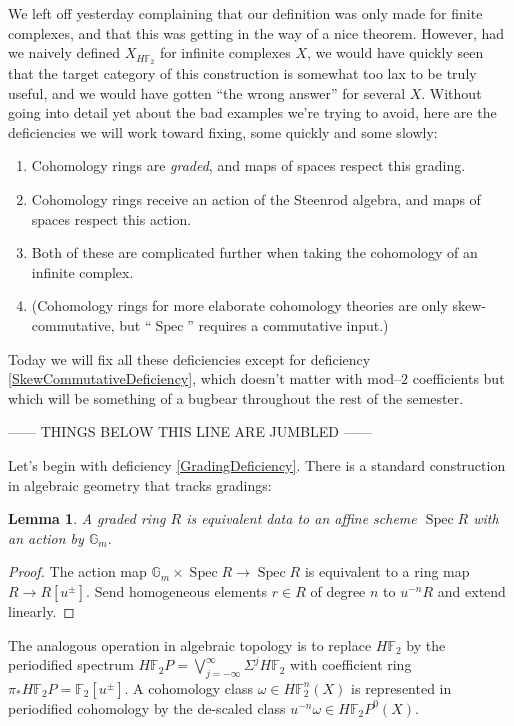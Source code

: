 \documentclass{article}
\newcommand{\F}{\mathbb F}
\newcommand{\<}{\langle}
\renewcommand{\>}{\rangle}
\newcommand{\Susp}{\Sigma}
\DeclareMathOperator{\Spec}{Spec}
\numberwithin{equation}{section}
\theoremstyle{plain}
\newtheorem{lemma}[equation]{Lemma}
\theoremstyle{definition}
\theoremstyle{remark}
\begin{document}
We left off yesterday complaining that our definition was only made for finite complexes, and that this was getting in the way of a nice theorem.  However, had we naively defined $X_{H\F_2}$ for infinite complexes $X$, we would have quickly seen that the target category of this construction is somewhat too lax to be truly useful, and we would have gotten ``the wrong answer'' for several $X$.  Without going into detail yet about the bad examples we're trying to avoid, here are the deficiencies we will work toward fixing, some quickly and some slowly:
\begin{enumerate}
\item \label{GradingDeficiency} Cohomology rings are \emph{graded}, and maps of spaces respect this grading.
\item \label{SteenrodDeficiency} Cohomology rings receive an action of the Steenrod algebra, and maps of spaces respect this action.
\item \label{InfiniteCplxDeficiency} Both of these are complicated further when taking the cohomology of an infinite complex.
\item \label{SkewCommutativeDeficiency} (Cohomology rings for more elaborate cohomology theories are only skew-commutative, but ``$\Spec$'' requires a commutative input.)
\end{enumerate}
Today we will fix all these deficiencies except for deficiency \ref{SkewCommutativeDeficiency}, which doesn't matter with mod--$2$ coefficients but which will be something of a bugbear throughout the rest of the semester.


------ THINGS BELOW THIS LINE ARE JUMBLED ------

Let's begin with deficiency \ref{GradingDeficiency}.  There is a standard construction in algebraic geometry that tracks gradings:
\begin{lemma}
A graded ring $R$ is equivalent data to an affine scheme $\Spec R$ with an action by $\mathbb G_m$.
\end{lemma}
\begin{proof}
 The action map $\mathbb G_m \times \Spec R \to \Spec R$ is equivalent to a ring map $R \to R[u^\pm]$.  Send homogeneous elements $r \in R$ of degree $n$ to $u^{-n} R$ and extend linearly.
\end{proof}
\noindent The analogous operation in algebraic topology is to replace $H\F_2$ by the periodified spectrum $H\F_2P = \bigvee_{j=-\infty}^\infty \Susp^j H\F_2$ with coefficient ring $\pi_* H\F_2P = \F_2[u^\pm]$.  A cohomology class $\omega \in H\F_2^n(X)$ is represented in periodified cohomology by the de-scaled class $u^{-n} \omega \in H\F_2P^0(X)$.
\end{document}
